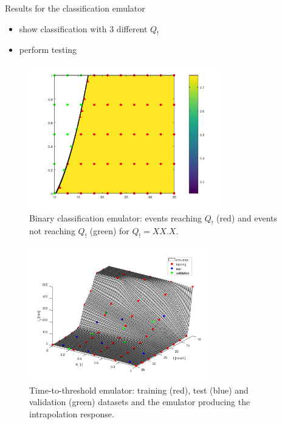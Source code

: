 Results for the classification emulator
\begin{itemize}
  \item show classification with 3 different $Q_!$
  \item perform testing 
\end{itemize}

\begin{figure}[htpb]
  \centering
  \includegraphics[width=0.75\textwidth]{Figures/classification.png}
  \caption{Binary classification emulator: events reaching $Q_!$ (red) and events not reaching $Q_!$ (green) for $Q_! = XX.X$.}
  \label{fig:classification_Q1}
\end{figure}




\begin{figure}[htpb]
  \centering
  \includegraphics[width=0.7\textwidth]{Figures/emulator.png}
  \caption{Time-to-threshold emulator: training (red), test (blue) and validation (green) datasets and the emulator producing the intrapolation response.}
  \label{fig:}
\end{figure}

